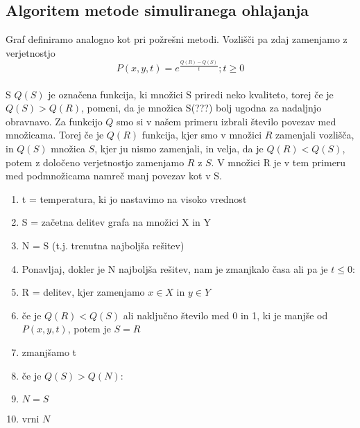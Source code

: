 \documentclass[12pt,a4paper]{amsart}
\theoremstyle{definition} %
\theoremstyle{plain} %
\begin{document}
\subsection{Algoritem metode simuliranega ohlajanja}
Graf definiramo analogno kot pri požrešni metodi. Vozlišči pa zdaj zamenjamo z verjetnostjo $$P(x,y,t) = e^{\frac{Q(R)-Q(S)}{t}}; t\ge 0$$ \\

S $Q(S)$ je označena funkcija, ki množici S priredi neko kvaliteto, torej če je $Q(S) >Q(R)$, pomeni, da je množica S(???) bolj ugodna za nadaljnjo obravnavo.
Za funkcijo $Q$ smo si v našem primeru izbrali število povezav med množicama. Torej če je $Q(R)$ funkcija, kjer smo v množici $R$ zamenjali vozlišča, in $Q(S)$ množica $S$, kjer ju nismo zamenjali, in velja, da je $Q(R)<Q(S)$, potem z določeno verjetnostjo zamenjamo $R$ z $S$. V množici R je v tem primeru med podmnožicama namreč manj povezav kot v S. \\
\begin{enumerate}
\item t = temperatura, ki jo nastavimo na visoko vrednost
\item S = začetna delitev grafa na množici X in Y 
\item N = S  (t.j. trenutna najboljša rešitev)
\item Ponavljaj, dokler je N najboljša rešitev, nam je zmanjkalo časa ali pa je $t \leq 0$:
\item \hspace{1cm} R = delitev, kjer zamenjamo $x\in X$ in $y\in Y$
\item \hspace{1cm} če je $Q(R)<Q(S)$ ali naključno število med 0 in 1, ki je manjše od $P(x,y,t)$, potem je $S=R$
\item \hspace{1cm} zmanjšamo t
\item \hspace{1cm} če je $Q(S)>Q(N)$:
\item \hspace{2cm} $N=S$
\item vrni $N$		\\
\end{enumerate}
\end{document}
